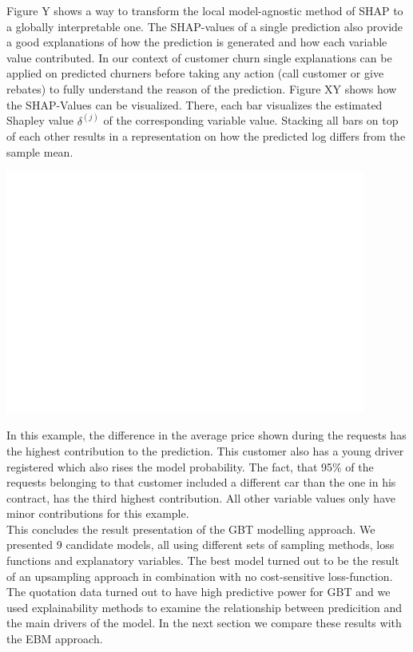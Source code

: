 \documentclass[12pt,titlepage]{article}
\begin{document}
Figure Y shows a way to transform the local model-agnostic method of SHAP to a globally interpretable one. The SHAP-values of a single prediction also provide a good explanations of how the prediction is generated and how each variable value contributed. In our context of customer churn single explanations can be applied on predicted churners before taking any action (call customer or give rebates) to fully understand the reason of the prediction. Figure XY shows how the SHAP-Values can be visualized. There, each bar visualizes the estimated Shapley value $\delta^{(j)}$ of the corresponding variable value. Stacking all bars on top of each other results in a representation on how the predicted log differs from the sample mean.\\
\centerline{\includegraphics[height=8cm]{shap_waterfall_example.png}}
In this example, the difference in the average price shown during the requests has the highest contribution to the prediction. This customer also has a young driver registered which also rises the model probability. The fact, that 95\% of the requests belonging to that customer included a different car than the one in his contract, has the third highest contribution. All other variable values only have minor contributions for this example. \\
This concludes the result presentation of the GBT modelling approach. We presented 9 candidate models, all using different sets of sampling methods, loss functions and explanatory variables. The best model turned out to be the result of an upsampling approach in combination with no cost-sensitive loss-function. The quotation data turned out to have high predictive power for GBT and we used explainability methods to examine the relationship between predicition and the main drivers of the model. In the next section we compare these results with the EBM approach. \\
\end{document}
